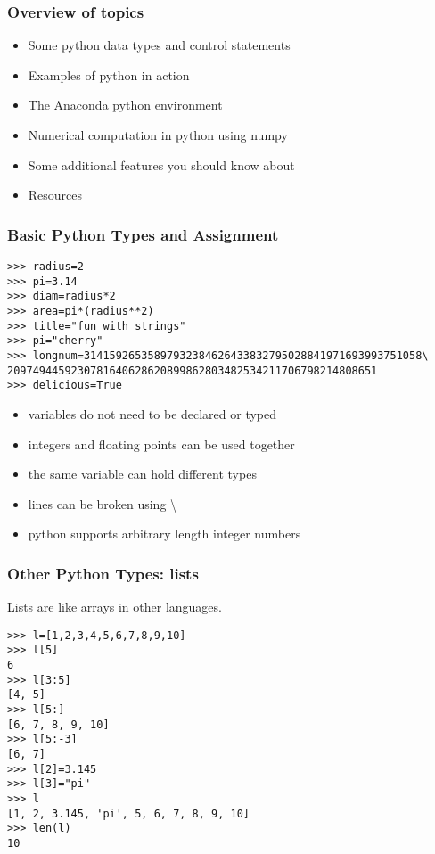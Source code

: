 \documentclass[10pt]{beamer}
\newcommand\smallfont{\fontsize{8pt}{7.2}\selectfont}
\begin{document}
\begin{frame}
\frametitle{Overview of topics}
\begin{itemize}
\item Some python data types and control statements
\item Examples of python in action
\item The Anaconda python environment
\item Numerical computation in python using numpy
\item Some additional features you should know about
\item Resources
\end{itemize}
\end{frame}
\begin{frame}[fragile]
\frametitle{Basic Python Types and Assignment}

\smallfont
\begin{verbatim}
>>> radius=2
>>> pi=3.14
>>> diam=radius*2
>>> area=pi*(radius**2)
>>> title="fun with strings"
>>> pi="cherry"
>>> longnum=31415926535897932384626433832795028841971693993751058\
2097494459230781640628620899862803482534211706798214808651
>>> delicious=True
\end{verbatim}

\begin{itemize}
\item variables do not need to be declared or typed
\item integers and floating points can be used together
\item the same variable can hold different types
\item lines can be broken using \textbackslash
\item python supports arbitrary length integer numbers
\end{itemize}
\end{frame}

\begin{frame}[fragile]
\frametitle{Other Python Types: lists}

Lists are like arrays in other languages.  
\begin{verbatim}
>>> l=[1,2,3,4,5,6,7,8,9,10]
>>> l[5]
6
>>> l[3:5]
[4, 5]
>>> l[5:]
[6, 7, 8, 9, 10]
>>> l[5:-3]
[6, 7]
>>> l[2]=3.145
>>> l[3]="pi"
>>> l
[1, 2, 3.145, 'pi', 5, 6, 7, 8, 9, 10]
>>> len(l)
10
\end{verbatim}

\end{frame}
\end{document}
